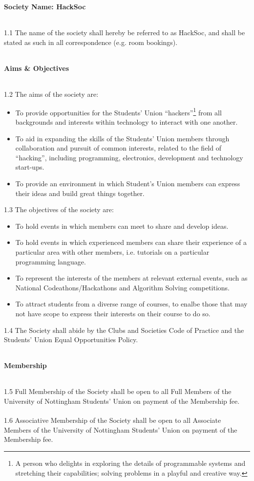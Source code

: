 \documentclass[a4paper,twoside,notitlepage,11pt]{article}
\newcommand{\consHead}[1]{\begin{Large}\textbf{#1}\end{Large}\ \\}
\begin{document}
\noindent
\consHead{Society Name: HackSoc}
1.1 The name of the society shall hereby be referred to as HackSoc, and shall be stated as such in all correspondence (e.g. room bookings).
\ \\
\ \\
\consHead{Aims \& Objectives}
1.2 The aims of the society are:
	\begin{itemize}
	\item To provide opportunities for the Students' Union ``hackers''\footnote{A person who delights in exploring the details of programmable systems and stretching their capabilities; solving problems in a playful and 		creative way.} from all backgrounds and interests within technology to interact with one another.
	\item To aid in expanding the skills of the Students' Union members through collaboration and pursuit of common interests, related to the field of ``hacking'', including programming, electronics, development and technology start-ups.
	\item To provide an environment in which Student's Union members can express their ideas and build great things together.
	\end{itemize}
1.3 The objectives of the society are:
	\begin{itemize}
	\item To hold events in which members can meet to share and develop ideas.
	\item To hold events in which experienced members can share their experience of a particular area with other members, i.e. tutorials on a particular programming language.
	\item To represent the interests of the members at relevant external events, such as National Codeathons/Hackathons and Algorithm Solving competitions.
	\item To attract students from a diverse range of courses, to enalbe those that may not have scope to express their interests on their course to do so.
	\end{itemize}
1.4 The Society shall abide by the Clubs and Societies Code of Practice and the Students' Union Equal Opportunities Policy.
\ \\
\ \\
\consHead{Membership}
1.5 Full Membership of the Society shall be open to all Full Members of the University of Nottingham Students' Union on payment of the Membership fee.\ \\
\ \\
1.6 Associative Membership of the Society shall be open to all Associate Members of the University of Nottingham Students' Union on payment of the Membership fee.\ \\
\end{document}

